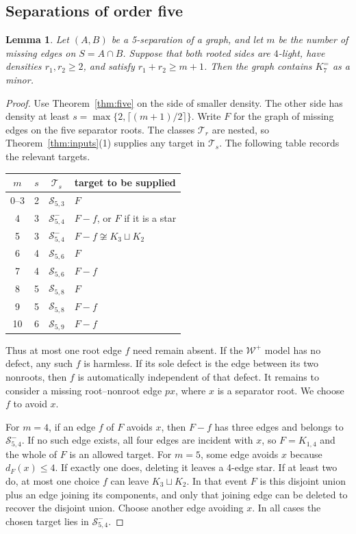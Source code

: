 \documentclass[11pt]{article}
\newtheorem{lemma}[theorem]{Lemma}
\theoremstyle{remark}
\numberwithin{equation}{section}
\newcommand{\Ke}{K_7^{=}}
\newcommand{\W}{\mathcal W}
\newcommand{\T}{\mathcal T}
\newcommand{\Sc}{\mathcal S}
\begin{document}
\subsection{Separations of order five}\label{subsec:joining}
\begin{lemma}\label{lem:joining}
Let $(A,B)$ be a 5-separation of a graph, and let $m$ be the number of missing edges on $S=A\cap B$. Suppose that both rooted sides are $4$-light, have densities $r_1,r_2\ge2$, and satisfy $r_1+r_2\ge m+1$. Then the graph contains $\Ke$ as a minor.
\end{lemma}
\begin{proof}
Use Theorem~\ref{thm:five} on the side of smaller density. The other side has density at least $s=\max\{2,\lceil(m+1)/2\rceil\}$. Write $F$ for the graph of missing edges on the five separator roots. The classes $\T_r$ are nested, so Theorem~\ref{thm:inputs}(1) supplies any target in $\T_s$. The following table records the relevant targets.
\begin{center}
\begin{tabular}{cccl}
\toprule
$m$&$s$&$\T_s$&target to be supplied\\
\midrule
$0$--$3$&2&$\Sc_{5,3}$&$F$\\
4&3&$\Sc^-_{5,4}$&$F-f$, or $F$ if it is a star\\
5&3&$\Sc^-_{5,4}$&$F-f\not\cong K_3\sqcup K_2$\\
6&4&$\Sc_{5,6}$&$F$\\
7&4&$\Sc_{5,6}$&$F-f$\\
8&5&$\Sc_{5,8}$&$F$\\
9&5&$\Sc_{5,8}$&$F-f$\\
10&6&$\Sc_{5,9}$&$F-f$\\
\bottomrule
\end{tabular}
\end{center}
Thus at most one root edge $f$ need remain absent. If the $\W^+$ model has no defect, any such $f$ is harmless. If its sole defect is the edge between its two nonroots, then $f$ is automatically independent of that defect. It remains to consider a missing root--nonroot edge $px$, where $x$ is a separator root. We choose $f$ to avoid $x$.

For $m=4$, if an edge $f$ of $F$ avoids $x$, then $F-f$ has three edges and belongs to $\Sc^-_{5,4}$. If no such edge exists, all four edges are incident with $x$, so $F=K_{1,4}$ and the whole of $F$ is an allowed target. For $m=5$, some edge avoids $x$ because $d_F(x)\le4$. If exactly one does, deleting it leaves a 4-edge star. If at least two do, at most one choice $f$ can leave $K_3\sqcup K_2$. In that event $F$ is this disjoint union plus an edge joining its components, and only that joining edge can be deleted to recover the disjoint union. Choose another edge avoiding $x$. In all cases the chosen target lies in $\Sc^-_{5,4}$.


\end{proof}
\end{document}
